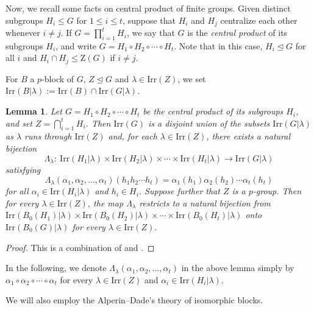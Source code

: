 \documentclass[10pt]{article}
\newtheorem{lem}{\bf Lemma}[section]
\begin{document}
Now, we recall some facts on central product of finite groups.
Given distinct subgroups $H_i \leq G$ for $1 \leq i \leq t$,
suppose that $H_i$ and $H_j$ centralize each other whenever $i \neq  j$. 
If $G=\prod_{i=1}^{t} H_i$, we say that $G$ is
the \emph{central product} of its subgroups $H_i$,
and write $G=H_1\circ H_2\circ \cdots \circ H_t$.
Note that in this case, $H_i\unlhd G$
for all $i$ and $H_i \cap H_j \leq \mathrm{Z}(G)$ if $i \neq j$.


For $B$ a $p$-block of $G$, $Z\unlhd G$ and $\lambda\in \mathrm{Irr}(Z)$, we
set $\mathrm{Irr}(B|\lambda):=\mathrm{Irr}(B)\cap \mathrm{Irr}(G|\lambda)$.



\begin{lem}\label{lem: cent prod of chars and blocks}
  Let $G=H_1\circ H_2\circ \cdots \circ H_t$ be the central product of its subgroups $H_i$, and set $Z = \bigcap_{i=1}^{t} H_i$.
  Then $\mathrm{Irr}(G)$ is a disjoint union of the subsets $\mathrm{Irr}(G|\lambda)$
  as $\lambda$ runs through $\mathrm{Irr}(Z)$
  and, 
  for each $\lambda\in \mathrm{Irr}(Z)$, there exists a natural bijection
   \[
    \Lambda_\lambda:~\mathrm{Irr}(H_1|\lambda)\times \mathrm{Irr}(H_2|\lambda)\times \cdots \times\mathrm{Irr}(H_t|\lambda) \rightarrow \mathrm{Irr}(G|\lambda)
    \]
 satisfying 
\[
\Lambda_{\lambda}(\alpha_1,\alpha_2,\dots,\alpha_t)(h_1h_2\cdots h_t)=\alpha_1(h_1)\alpha_2(h_2)\cdots\alpha_t(h_t)
\]
for all $\alpha_i\in \mathrm{Irr}(H_i|\lambda)$ and $h_i\in H_i$.
  Suppose further that $Z$ is a $p$-group.
   Then for every $\lambda\in\mathrm{Irr}(Z)$, the map $\Lambda_\lambda$ restricts to a natural bijection from
  $\mathrm{Irr}(B_0(H_1)|\lambda)\times \mathrm{Irr}(B_0(H_2)|\lambda) \times \cdots \times\mathrm{Irr}(B_0(H_t)|\lambda)$ 
  onto $\mathrm{Irr}(B_0(G)|\lambda)$ for every $\lambda\in \mathrm{Irr}(Z)$.
  \end{lem}
\begin{proof}
  This is a combination of \cite[Theorem 10.7]{navarro18} and \cite[Lemma 4.1]{malle23}.
\end{proof}

 In the following, 
   we denote $\Lambda_{\lambda}(\alpha_1,\alpha_2,\dots,\alpha_t)$ in the above lemma 
   simply by $\alpha_1\circ \alpha_2\circ \cdots\circ \alpha_t$
   for every $\lambda\in \mathrm{Irr}(Z)$ and $\alpha_i\in \mathrm{Irr}(H_i|\lambda)$.




	We will also employ the Alperin--Dade's theory of isomorphic blocks.
\end{document}
